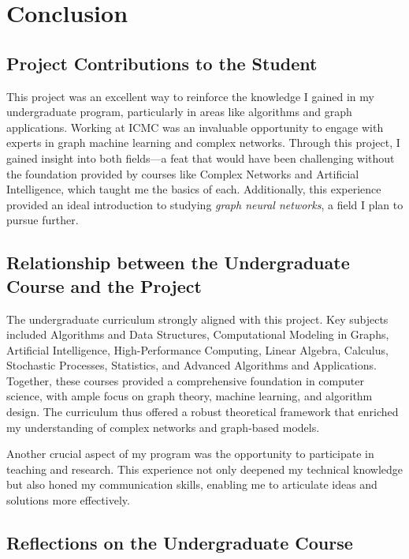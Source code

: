 \chapter{Conclusion}
\label{Conclusion}

\section{Project Contributions to the Student}

This project was an excellent way to reinforce the knowledge I gained
in my undergraduate program, particularly in areas like algorithms and
graph applications. Working at ICMC was an invaluable opportunity to
engage with experts in graph machine learning and complex
networks. Through this project, I gained insight into both fields—a
feat that would have been challenging without the foundation provided
by courses like Complex Networks and Artificial Intelligence, which
taught me the basics of each. Additionally, this experience provided
an ideal introduction to studying \emph{graph neural networks}, a
field I plan to pursue further.

\section{Relationship between the Undergraduate Course and the Project}

The undergraduate curriculum strongly aligned with this project. Key
subjects included Algorithms and Data Structures, Computational
Modeling in Graphs, Artificial Intelligence, High-Performance
Computing, Linear Algebra, Calculus, Stochastic Processes, Statistics,
and Advanced Algorithms and Applications. Together, these courses
provided a comprehensive foundation in computer science, with ample
focus on graph theory, machine learning, and algorithm design. The
curriculum thus offered a robust theoretical framework that enriched
my understanding of complex networks and graph-based models.

Another crucial aspect of my program was the opportunity to
participate in teaching and research. This experience not only
deepened my technical knowledge but also honed my communication
skills, enabling me to articulate ideas and solutions more
effectively.

\section{Reflections on the Undergraduate Course}

